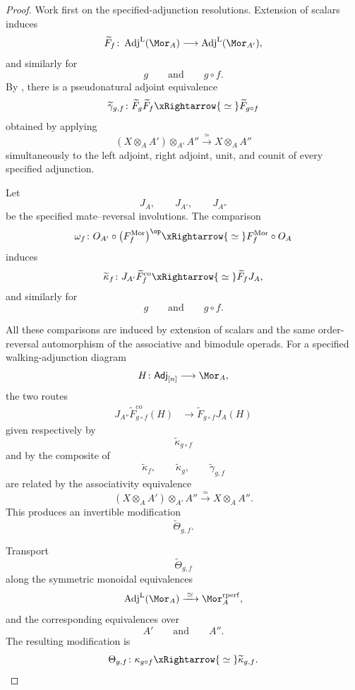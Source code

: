 \begin{proof}
Work first on the specified-adjunction resolutions. Extension of scalars
induces
\[
    \widetilde F_f
    \colon
    \operatorname{Adj}^{\mathrm L}(\Mor_A)
    \longrightarrow
    \operatorname{Adj}^{\mathrm L}(\Mor_{A'}),
\]
and similarly for
\[
    g
    \qquad\text{and}\qquad
    g\circ f.
\]
By
,
there is a pseudonatural adjoint equivalence
\[
    \widetilde\gamma_{g,f}
    \colon
    \widetilde F_g\widetilde F_f
    \xRightarrow{\;\simeq\;}
    \widetilde F_{g\circ f}
\]
obtained by applying
\[
    (X\otimes_A A')\otimes_{A'}A''
    \xrightarrow{\;\simeq\;}
    X\otimes_A A''
\]
simultaneously to the left adjoint, right adjoint, unit, and counit of
every specified adjunction.

Let
\[
    J_A,
    \qquad
    J_{A'},
    \qquad
    J_{A''}
\]
be the specified mate--reversal involutions. The comparison
\[
    \omega_f
    \colon
    O_{A'}
    \circ
    \bigl(
        F_f^{\mathrm{Mor}}
    \bigr)^{\op}
    \xRightarrow{\;\simeq\;}
    F_f^{\mathrm{Mor}}
    \circ
    O_A
\]
induces
\[
    \widetilde\kappa_f
    \colon
    J_{A'}\widetilde F_f^{\mathrm{co}}
    \xRightarrow{\;\simeq\;}
    \widetilde F_fJ_A,
\]
and similarly for
\[
    g
    \qquad\text{and}\qquad
    g\circ f.
\]

All these comparisons are induced by extension of scalars and the same
order-reversal automorphism of the associative and bimodule operads.
For a specified walking-adjunction diagram
\[
    H
    \colon
    \mathsf{Adj}_{[n]}
    \longrightarrow
    \Mor_A,
\]
the two routes
\[
\begin{aligned}
    J_{A''}
    \widetilde F_{g\circ f}^{\mathrm{co}}(H)
    &\longrightarrow
    \widetilde F_{g\circ f}J_A(H)
\end{aligned}
\]
given respectively by
\[
    \widetilde\kappa_{g\circ f}
\]
and by the composite of
\[
    \widetilde\kappa_f,
    \qquad
    \widetilde\kappa_g,
    \qquad
    \widetilde\gamma_{g,f}
\]
are related by the associativity equivalence
\[
    (X\otimes_A A')\otimes_{A'}A''
    \xrightarrow{\;\simeq\;}
    X\otimes_A A''.
\]
This produces an invertible modification
\[
    \widetilde\Theta_{g,f}.
\]

Transport
\[
    \widetilde\Theta_{g,f}
\]
along the symmetric monoidal equivalences
\[
    \operatorname{Adj}^{\mathrm L}(\Mor_A)
    \xrightarrow{\;\simeq\;}
    \Mor_A^{\mathrm{rperf}},
\]
and the corresponding equivalences over
\[
    A'
    \qquad\text{and}\qquad
    A''.
\]
The resulting modification is
\[
    \Theta_{g,f}
    \colon
    \kappa_{g\circ f}
    \xRightarrow{\;\simeq\;}
    \widetilde\kappa_{g,f}.
\]


\end{proof}
